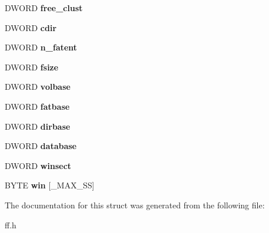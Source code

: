 \begin{DoxyCompactItemize}
D\+W\+O\+RD {\bfseries free\+\_\+clust}
\item 
\mbox{\label{struct_f_a_t_f_s_a217d0ce0c8cec84aa7f0c142679412c6}} 
D\+W\+O\+RD {\bfseries cdir}
\item 
\mbox{\label{struct_f_a_t_f_s_a8da50eeba6469bc20d60ca0cf9a1307c}} 
D\+W\+O\+RD {\bfseries n\+\_\+fatent}
\item 
\mbox{\label{struct_f_a_t_f_s_a53e9560659f14e66f306c2c444198bf3}} 
D\+W\+O\+RD {\bfseries fsize}
\item 
\mbox{\label{struct_f_a_t_f_s_a8f0ca578755749d204f59dc83f1a7649}} 
D\+W\+O\+RD {\bfseries volbase}
\item 
\mbox{\label{struct_f_a_t_f_s_a848fba02c4aabe02ef2984e578f33d64}} 
D\+W\+O\+RD {\bfseries fatbase}
\item 
\mbox{\label{struct_f_a_t_f_s_a3f72fd998dbcce4652a85a81fe944bc4}} 
D\+W\+O\+RD {\bfseries dirbase}
\item 
\mbox{\label{struct_f_a_t_f_s_a5b6c0bc2e9fd2ae8ef714210a74a2d5d}} 
D\+W\+O\+RD {\bfseries database}
\item 
\mbox{\label{struct_f_a_t_f_s_ac60e69c00e6bf7c25febfbac4dc1476b}} 
D\+W\+O\+RD {\bfseries winsect}
\item 
\mbox{\label{struct_f_a_t_f_s_a7cc35a593465e727ab87723c14610644}} 
B\+Y\+TE {\bfseries win} \mbox{[}\+\_\+\+M\+A\+X\+\_\+\+SS\mbox{]}
\end{DoxyCompactItemize}


The documentation for this struct was generated from the following file\+:\begin{DoxyCompactItemize}
\item 
ff.\+h\end{DoxyCompactItemize}
